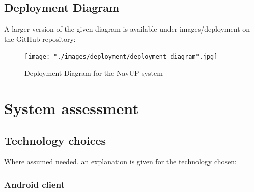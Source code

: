 \documentclass{article}
\begin{document}
		\pagebreak
		
		\subsection{Deployment Diagram}
		
		A larger version of the given diagram is available under images/deployment on the GitHub repository:
		
		\begin{figure}
			\centering
			\texttt{[image: "./images/deployment/deployment\_diagram".jpg]}
			\caption{Deployment Diagram for the NavUP system}
		\end{figure}
	
	\pagebreak
	
	\section{System assessment}	
	
		\subsection{Technology choices}
		
		Where assumed needed, an explanation is given for the technology chosen:
		
		\subsubsection{Android client}
		
\end{document}
